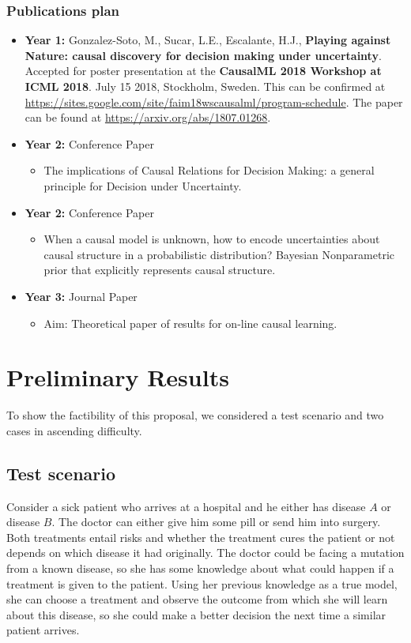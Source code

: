\documentclass[english,letterpaper,12pt,final]{article}
\theoremstyle{definition}
\begin{document}
\subsubsection{Publications plan}
\begin{itemize}
\item \textbf{Year 1:} Gonzalez-Soto, M., Sucar, L.E., Escalante, H.J., \textbf{Playing against Nature: causal discovery for decision making under uncertainty}. Accepted for poster presentation at the \textbf{CausalML 2018 Workshop at ICML 2018}. July 15 2018, Stockholm, Sweden. This can be confirmed at \url{https://sites.google.com/site/faim18wscausalml/program-schedule}. The paper can be found at \url{https://arxiv.org/abs/1807.01268}.
\item \textbf{Year 2:} Conference Paper
		\begin{itemize}
		\item The implications of Causal Relations for Decision Making: a general principle for Decision under Uncertainty.
		\end{itemize}
\item \textbf{Year 2:} Conference Paper
	\begin{itemize}
	\item When a causal model is unknown, how to encode uncertainties about causal structure in a probabilistic distribution? Bayesian Nonparametric prior that explicitly represents causal structure.
	\end{itemize}
\item \textbf{Year 3:} Journal Paper
		\begin{itemize}
			\item Aim: Theoretical paper of results for on-line causal learning.
		\end{itemize}
\end{itemize}

\newpage
\section{Preliminary Results}
To show the factibility of this proposal, we considered a test scenario and two cases in ascending difficulty.
\subsection{Test scenario}
Consider a sick patient who arrives at a hospital and he either has disease $A$ or disease $B$. The doctor can either give him some pill or send him into surgery.  Both treatments entail risks and whether the treatment cures the patient or not depends on which disease it had originally. The doctor could be facing a mutation from a known disease, so she has some knowledge about what could happen if a treatment is given to the patient. Using her previous knowledge as a true model, she can choose a treatment and observe the outcome from which she will learn about this disease, so she could make a better decision the next time a similar patient arrives.
\end{document}
